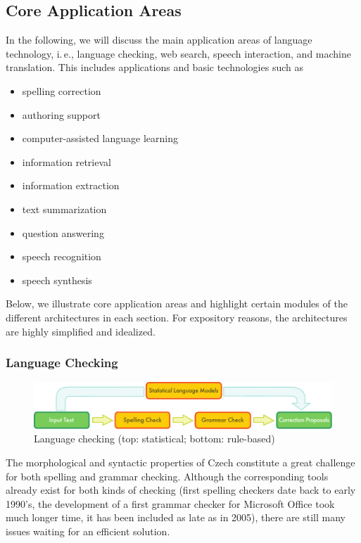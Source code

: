\begin{multicols}{2}
\subsection{Core Application Areas}
In the following, we will discuss the main application areas of language technology, i.\,e., language checking, web search, speech interaction, and machine translation. This includes applications and basic technologies such as
\begin{itemize}
  \item spelling correction
  \item authoring support
  \item computer-assisted language learning
  \item information retrieval
  \item information extraction
  \item text summarization
  \item question answering
  \item speech recognition
  \item speech synthesis
\end{itemize}
Below, we illustrate core application areas and highlight certain modules of the different architectures in each section. For expository reasons, the architectures are highly simplified and idealized.

\subsubsection{Language Checking}

  \begin{figure}[t]
  \center
  \includegraphics[width=\textwidth]{../_media/english/language_checking}
  \caption{Language checking (top: statistical; bottom: rule-based)}
  \label{fig:langcheckingaarch_en}
\end{figure}

The morphological and syntactic properties of Czech constitute a great challenge for both spelling and grammar checking. Although the corresponding tools already exist for both kinds of checking (first spelling checkers date back to early 1990’s, the development of a first grammar checker for Microsoft Office took much longer time, it has been included as late as in 2005), there are still many issues waiting for an efficient solution.


\end{multicols}
